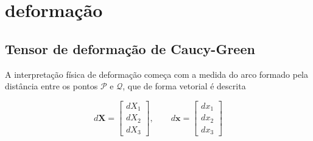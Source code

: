 \chapter{deformação}
\section{Tensor de deformação de Caucy-Green}
A interpretação física de deformação começa com a medida do arco formado pela distância entre os pontos $\mathcal{P}$ e $\mathcal{Q}$, que de forma vetorial é descrita

\begin{equation}
	d \mathbf{X} = 
	\left[\begin{array}{ccc}
		dX_1 \\ dX_2 \\ dX_3
	\end{array}\right],
	\qquad
	d \mathbf{x} = 
	\left[\begin{array}{ccc}
		dx_1 \\ dx_2 \\ dx_3
	\end{array}\right]
\end{equation}
 
